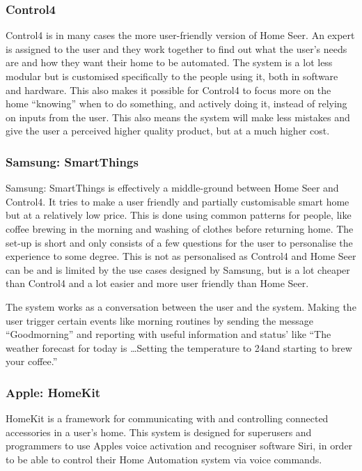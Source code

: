 \subsubsection{Control4}
Control4 is in many cases the more user-friendly version of Home Seer. An expert is assigned to the user and they work together to find out what the user's needs are and how they want their home to be automated. The system is a lot less modular but is customised specifically to the people using it, both in software and hardware. This also makes it possible for Control4 to focus more on the home \enquote{knowing} when to do something, and actively doing it, instead of relying on inputs from the user. This also means the system will make less mistakes and give the user a perceived higher quality product, but at a much higher cost.%

\subsubsection{Samsung: SmartThings}
Samsung: SmartThings is effectively a middle-ground between Home Seer and Control4. It tries to make a user friendly and partially customisable smart home but at a relatively low price. This is done using common patterns for people, like coffee brewing in the morning and washing of clothes before returning home. The set-up is short and only consists of a few questions for the user to personalise the experience to some degree. This is not as personalised as Control4 and Home Seer can be and is limited by the use cases designed by Samsung, but is a lot cheaper than Control4 and a lot easier and more user friendly than Home Seer.

The system works as a conversation between the user and the system. Making the user trigger certain events like morning routines by sending the message \enquote{Goodmorning} and reporting with useful information and status' like \enquote{The weather forecast for today is \dots Setting the temperature to 24\degree and starting to brew your coffee.}

\subsubsection{Apple: HomeKit}
HomeKit is a framework for communicating with and controlling connected accessories in a user's home. %
This system is designed for superusers and programmers to use Apples voice activation and recogniser software Siri, in order to be able to control their Home Automation system via voice commands.

